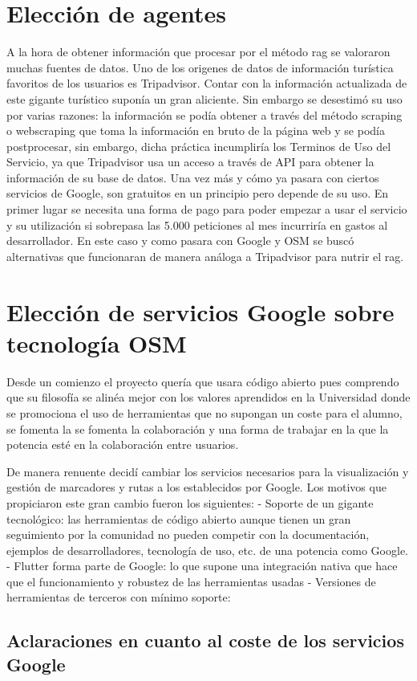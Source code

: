 \section{Elección de agentes}
A la hora de obtener información que procesar por el método \acrshort{rag} se valoraron muchas fuentes de datos. Uno de los origenes de datos de información turística favoritos de los usuarios es Tripadvisor. Contar con la información actualizada de este gigante turístico suponía un gran aliciente. Sin embargo se desestimó su uso por varias razones: la información se podía obtener a través del método scraping o webscraping que toma la información en bruto de la página web y se podía postprocesar, sin embargo, dicha práctica incumpliría los Terminos de Uso del Servicio, ya que Tripadvisor usa un acceso a través de API para obtener la información de su base de datos. Una vez más y cómo ya pasara con ciertos servicios de Google, son gratuitos en un principio pero depende de su uso. En primer lugar se necesita una forma de pago para poder empezar a usar el servicio y su utilización si sobrepasa las 5.000 peticiones al mes incurriría en gastos al desarrollador. En este caso y como pasara con Google y OSM se buscó alternativas que funcionaran de manera análoga a Tripadvisor para nutrir el \acrshort{rag}.

\section{Elección de servicios Google sobre tecnología OSM}
\label{sec:google_over_osm}
Desde un comienzo el proyecto quería que usara código abierto pues comprendo que su filosofía se alinéa mejor con los valores aprendidos en la Universidad donde se promociona el uso de herramientas que no supongan un coste para el alumno, se fomenta la  se fomenta la colaboración y una forma de trabajar en la que la potencia esté en la colaboración entre usuarios.

De manera renuente decidí cambiar los servicios necesarios para la visualización y gestión de marcadores y rutas a los establecidos por Google. Los motivos que propiciaron este gran cambio fueron los siguientes:
- Soporte de un gigante tecnológico: las herramientas de código abierto aunque tienen un gran seguimiento por la comunidad no pueden competir con la documentación, ejemplos de desarrolladores, tecnología de uso, etc. de una potencia como Google.
- Flutter forma parte de Google: lo que supone una integración nativa que hace que el funcionamiento y robustez de las herramientas usadas 
- Versiones de herramientas de terceros con mínimo soporte: 
\subsection{Aclaraciones en cuanto al coste de los servicios Google}
